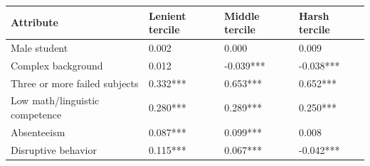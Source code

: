 \begin{tabular}{llll}
\toprule
Attribute & Lenient tercile & Middle tercile & Harsh tercile\\
\midrule
Male student & 0.002 & 0.000 & 0.009\\
Complex background & 0.012 & -0.039*** & -0.038***\\
Three or more failed subjects & 0.332*** & 0.653*** & 0.652***\\
Low math/linguistic competence & 0.280*** & 0.289*** & 0.250***\\
Absenteeism & 0.087*** & 0.099*** & 0.008\\
\addlinespace
Disruptive behavior & 0.115*** & 0.067*** & -0.042***\\
\bottomrule
\end{tabular}
